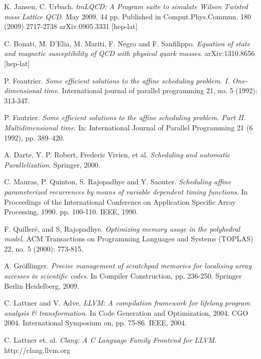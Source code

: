 \documentclass{sigplanconf}
\begin{document}

\begin{thebibliography}
\softraggedright


K. Jansen, C. Urbach. \emph{tmLQCD: A Program suite to simulate Wilson Twisted mass Lattice QCD}. May 2009. 44 pp.
Published in Comput.Phys.Commun. 180 (2009) 2717-2738
arXiv:0905.3331 [hep-lat]

C. Bonati, M. D'Elia, M. Mariti, F. Negro and F. Sanfilippo. \emph{Equation of state and magnetic susceptibility of  QCD with physical quark masses}. arXiv:1310.8656 [hep-lat]




P. Feautrier. \emph{Some efficient solutions to the affine scheduling problem. I. One-dimensional time}. International journal of parallel programming 21, no. 5 (1992): 313-347.

P. Fautrier. \emph{Some efficient solutions to the affine scheduling problem. Part II. Multidimensional time}. In: International Journal of Parallel Programming 21 (6 1992), pp. 389–420.

A. Darte, Y. P. Robert, Frederic Vivien, et al. \emph{Scheduling and automatic Parallelization}. Springer, 2000.


C. Mauras, P. Quinton, S. Rajopadhye and Y. Saouter. \emph{Scheduling affine parameterized recurrences by means of variable dependent timing functions}. In Proceedings of the International Conference on Application Specific Array Processing, 1990. pp. 100-110. IEEE, 1990.

F. Quilleré, and S, Rajopadhye. \emph{Optimizing memory usage in the polyhedral model}. ACM Transactions on Programming Languages and Systems (TOPLAS) 22, no. 5 (2000): 773-815.

A. Gr{\"o}{\ss}linger. \emph{Precise management of scratchpad memories for localising array accesses in scientific codes}. In Compiler Construction, pp. 236-250. Springer Berlin Heidelberg, 2009.


C. Lattner and V. Adve. \emph{LLVM: A compilation framework for lifelong program analysis \& transformation}. In Code Generation and Optimization, 2004. CGO 2004. International Symposium on, pp. 75-86. IEEE, 2004.

C. Lattner et. al. \emph{Clang: A C Language Family Frontend for LLVM}. {http://clang.llvm.org} 





\end{thebibliography}
\end{document}
